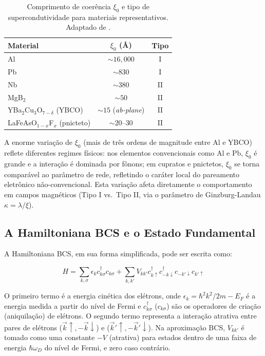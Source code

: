 \documentclass[12pt, a4paper, oneside]{report}
\begin{document}
\begin{table}[H]
    \centering
    \caption{Comprimento de coerência $\xi_0$ e tipo de supercondutividade para materiais representativos. Adaptado de \cite{tinkham1996}.}
    \label{tab:coerencia}
    \begin{tabular}{lcc}
        \toprule
        \textbf{Material} & \textbf{$\xi_0$ (Å)} & \textbf{Tipo} \\
        \midrule
        Al              & $\sim 16{,}000$ & I \\
        Pb              & $\sim 830$      & I \\
        Nb              & $\sim 380$      & II \\
        MgB$_2$         & $\sim 50$       & II \\
        YBa$_2$Cu$_3$O$_{7-\delta}$ (YBCO) & $\sim 15$ (\textit{ab-plane}) & II \\
        LaFeAsO$_{1-x}$F$_x$ (pnicteto) & $\sim 20$--$30$ & II \\
        \bottomrule
    \end{tabular}
\end{table}

A enorme variação de $\xi_0$ (mais de três ordens de magnitude entre Al e YBCO) reflete diferentes regimes físicos: nos elementos convencionais como Al e Pb, $\xi_0$ é grande e a interação é dominada por fônons; em cupratos e pnictetos, $\xi_0$ se torna comparável ao parâmetro de rede, refletindo o caráter local do pareamento eletrônico não-convencional. Esta variação afeta diretamente o comportamento em campos magnéticos (Tipo I vs.\ Tipo II, via o parâmetro de Ginzburg-Landau $\kappa = \lambda/\xi$).

\subsection{A Hamiltoniana BCS e o Estado Fundamental}

A Hamiltoniana BCS, em sua forma simplificada, pode ser escrita como:

\begin{equation}
    H = \sum_{k,\sigma} \epsilon_k c_{k\sigma}^\dagger c_{k\sigma} + \sum_{k,k'} V_{kk'} c_{k\uparrow}^\dagger c_{-k\downarrow}^\dagger c_{-k'\downarrow} c_{k'\uparrow}
\end{equation}

O primeiro termo é a energia cinética dos elétrons, onde $\epsilon_k = \hbar^2 k^2 / 2m - E_F$ é a energia medida a partir do nível de Fermi e $c_{k\sigma}^\dagger$ ($c_{k\sigma}$) são os operadores de criação (aniquilação) de elétrons. O segundo termo representa a interação atrativa entre pares de elétrons ($\vec{k}\uparrow, -\vec{k}\downarrow$) e ($\vec{k}'\uparrow, -\vec{k}'\downarrow$). Na aproximação BCS, $V_{kk'}$ é tomado como uma constante $-V$ (atrativa) para estados dentro de uma faixa de energia $\hbar \omega_D$ do nível de Fermi, e zero caso contrário.
\end{document}
